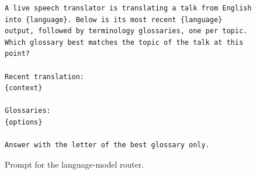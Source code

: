 \begin{figure}[t]
\begin{Verbatim}[fontsize=\small,fontfamily=\rmdefault,frame=single,breaklines=true,breaksymbolleft={}]
A live speech translator is translating a talk from English into {language}. Below is its most recent {language} output, followed by terminology glossaries, one per topic. Which glossary best matches the topic of the talk at this point?

Recent translation:
{context}

Glossaries:
{options}

Answer with the letter of the best glossary only.
\end{Verbatim}
\caption{Prompt for the language-model router.}
\label{fig:router-prompt}
\end{figure}

